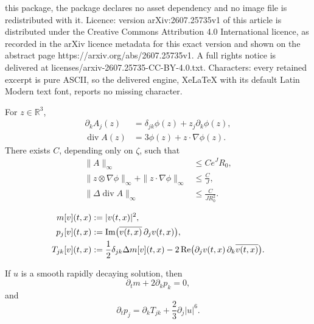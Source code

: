 \documentclass[10pt,a4paper]{amsart}
\newcommand{\Ima}{\operatorname{Im}}
\newcommand{\Rea}{\operatorname{Re}}
\newcommand{\R}{\mathbb R}
\begin{document}
this package, the package declares no asset dependency and no image file is redistributed with it. Licence: version arXiv:2607.25735v1 of this article is distributed under the Creative Commons Attribution 4.0 International licence, as recorded in the arXiv licence metadata for this exact version and shown on the abstract page https://arxiv.org/abs/2607.25735v1. A full rights notice is delivered at licenses/arxiv-2607.25735-CC-BY-4.0.txt. Characters: every retained excerpt is pure ASCII, so the delivered engine, XeLaTeX with its default Latin Modern text font, reports no missing character.
\begin{lemma}\label{lem:kernel-bounds}
For $z\in\R^3$,
\begin{align}
 \partial_kA_j(z)
 &=\delta_{jk}\phi(z)+z_j\partial_k\phi(z),
 \label{eq:A-Hessian}\\
 \operatorname{div}A(z)
 &=3\phi(z)+z\cdot\nabla\phi(z).
 \label{eq:A-divergence}
\end{align}
There exists $C$, depending only on $\zeta$, such that
\begin{align}
 \|A\|_\infty&\le Ce^JR_0,
 \label{eq:A-endpoint-bound}\\
 \|z\otimes\nabla\phi\|_\infty
 +\|z\cdot\nabla\phi\|_\infty
 &\le \frac{C}{J},
 \label{eq:flat-error-bound}\\
 \|\Delta\operatorname{div}A\|_\infty
 &\le \frac{C}{JR_0^2}.
 \label{eq:biharmonic-bound}
\end{align}
\end{lemma}

\begin{align}
 m[v](t,x)&:=|v(t,x)|^2,\notag\\
 p_j[v](t,x)&:=\Ima\bigl(\overline{v(t,x)}\,\partial_jv(t,x)\bigr),\notag\\
 T_{jk}[v](t,x)&:=\frac12\delta_{jk}\Delta m[v](t,x)
 -2\Rea\bigl(\partial_jv(t,x)\,\partial_k\overline{v(t,x)}\bigr).
 \label{eq:T-def}
\end{align}

\begin{lemma}\label{lem:local-laws}
If $u$ is a smooth rapidly decaying solution, then
\begin{equation}\label{eq:local-mass-law}
 \partial_tm+2\partial_kp_k=0,
\end{equation}
and
\begin{equation}\label{eq:local-momentum-law}
 \partial_tp_j
 =\partial_kT_{jk}+\frac23\partial_j|u|^6.
\end{equation}
\end{lemma}
\end{document}
